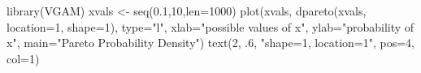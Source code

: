 \begin{Schunk}
\begin{Sinput}
 library(VGAM)
 xvals <- seq(0.1,10,len=1000)
 plot(xvals, dpareto(xvals, location=1, shape=1), type="l", xlab="possible values of x", ylab="probability of x", main="Pareto Probability Density")
 text(2, .6, "shape=1, location=1", pos=4, col=1)
 
\end{Sinput}
\end{Schunk}
